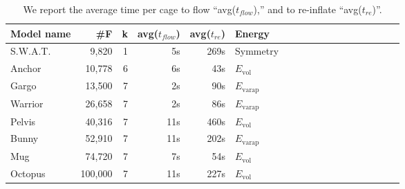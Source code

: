 \begin{table}
\centering
{}
\setlength{\tabcolsep}{5.5pt}
\begin{tabular}{l r r r r l r r r r r r r r r r r r}
\rowcolor{white}
Model name  & \#F & k & avg($t_{flow}$) & avg($t_{re}$) & Energy\\
\midrule
S.W.A.T. & 9,820 & 1 & 5s & 269s & Symmetry \\
Anchor & 10,778 & 6 & 6s & 43s & $E_\text{vol}$ \\
Gargo & 13,500 & 7 & 2s & 90s & $E_\text{varap}$\\
Warrior & 26,658 & 7 & 2s & 86s & $E_\text{varap}$  \\
Pelvis & 40,316 & 7 & 11s & 460s & $E_\text{vol}$  \\
Bunny & 52,910 & 7 & 11s & 202s & $E_\text{varap}$ \\
Mug & 74,720 & 7 & 7s & 54s & $E_\text{vol}$ \\
Octopus & 100,000 & 7 & 11s & 227s & $E_\text{vol}$ \\
\bottomrule
\end{tabular}
\caption{
We report the average time per cage to flow ``avg($t_{flow}$),'' and to
re-inflate ``avg($t_{re}$)''.
}
\label{tab:timings}
\end{table}
